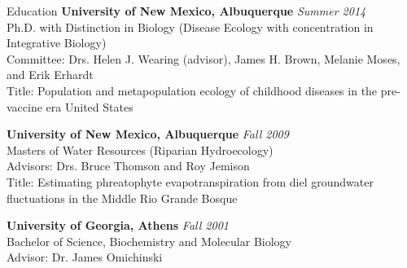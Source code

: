 \documentclass{resume} %
\begin{document}

\begin{rSection}{Education}
{\bf University of New Mexico, Albuquerque} \hfill {\em Summer 2014} \\ 
Ph.D. with Distinction in Biology (Disease Ecology with concentration in
Integrative Biology) \\
Committee: Drs. Helen J. Wearing (advisor), James H. Brown, Melanie Moses, and Erik Erhardt\\
Title: Population and metapopulation ecology of childhood diseases in the pre-vaccine era United States

{\bf University of New Mexico, Albuquerque} \hfill {\em Fall 2009} \\ 
Masters of Water Resources (Riparian Hydroecology) \\
Advisors: Drs. Bruce Thomson and Roy Jemison \\
Title: Estimating phreatophyte evapotranspiration from diel groundwater fluctuations in the Middle Rio Grande Bosque

{\bf University of Georgia, Athens} \hfill {\em Fall 2001} \\ 
Bachelor of Science, Biochemistry and Molecular Biology \\
Advisor: Dr. James Omichinski
\end{rSection}

\newcommand{\authSelf}{{\bf C.E. Gunning}}



\end{document}
